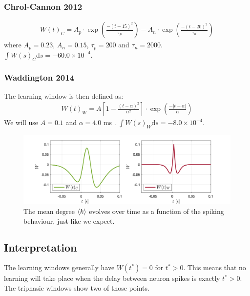 \subsubsection{Chrol-Cannon 2012}
\begin{align}
W(t)_C = A_{p} \cdot \exp \left(\frac{-\left(t - 15 \right)^{2}}{ \tau_{p}}\right) - A_{n} \cdot \exp \left(\frac{-\left(t - 20\right)^{2}}{ \tau_{n}}\right)  \label{eq:learningwindowChrolCannon2012}
\end{align}
where $A_{p}=0.23$, $A_{n}=0.15$, $\tau_{p}=200$ and $\tau_n = 2000$. $\int W(s)_C \mathrm{d}s = -60.0 \times 10^{-4}$.

\subsubsection{Waddington 2014}
The learning window is then defined as:
\begin{align}
W(t)_W =  A \left[1-\frac{\left(t-\alpha\right)^{2}}{\alpha^{2}}\right] \cdot \exp \left(\frac{-\left|t - \alpha\right|}{\alpha}\right) \label{eq:learningwindowWaddington2014}
\end{align}
We will use $A = 0.1$ and $\alpha = 4.0$ ms . $\int W(s)_W \mathrm{d}s = -8.0 \times 10^{-4}$.

\begin{figure}[H]
\centering
\includegraphics[width = \textwidth]{../Figures/LearningWindowsTriphasic.png}
\caption{The mean degree ${\langle k\rangle}$ evolves over time as a function of the spiking behaviour, just like we expect.}
\label{fig:LearningWindowsTriphasic}
\end{figure}


\subsection{Interpretation}
The learning windows generally have $W(t^{\ast}) = 0$ for $t^{\ast} > 0$. This means that no learning will take place when the delay between neuron spikes is exactly $t^{\ast} > 0$. The triphasic windows show two of those points.

